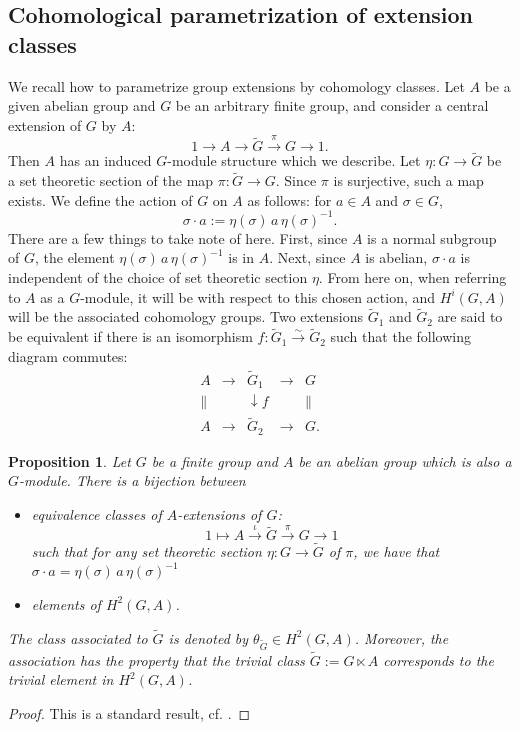 \documentclass[11pt,reqno]{amsart}
\newtheorem{proposition}[theorem]{Proposition}
\numberwithin{equation}{section}
\begin{document}
\subsection{Cohomological parametrization of extension classes}
\par We recall how to parametrize group extensions by cohomology classes. Let $A$ be a given abelian group and $G$ be an arbitrary finite group, and consider a central extension of $G$ by $A$:
\[1\rightarrow A\rightarrow \widetilde{G}\xrightarrow{\pi} G\rightarrow 1.\]
Then $A$ has an induced $G$-module structure which we describe. Let $\eta: G\rightarrow \widetilde{G}$ be a set theoretic section of the map $\pi: \widetilde{G}\rightarrow G$. Since $\pi$ is surjective, such a map exists. We define the action of $G$ on $A$ as follows: for $a\in A$ and $\sigma\in G$,
\[\sigma\cdot a:=\eta(\sigma) \, a \, \eta(\sigma)^{-1}.\] There are a few things to take note of here. First, since $A$ is a normal subgroup of $G$, the element $\eta(\sigma) \, a \, \eta(\sigma)^{-1}$ is in $A$. Next, since $A$ is abelian, $\sigma\cdot a$ is independent of the choice of set theoretic section $\eta$. From here on, when referring to $A$ as a $G$-module, it will be with respect to this chosen action, and $H^i(G, A)$ will be the associated cohomology groups. Two extensions $\widetilde{G}_{1}$ and $\widetilde{G}_{2}$ are said to be equivalent if there is an isomorphism $f:\widetilde{G}_1\xrightarrow{\sim} \widetilde{G}_2$ such that the following diagram commutes:
$$
\begin{array}{ccccc}
A & \longrightarrow & \widetilde{G}_{1} & \longrightarrow & G  \\
\| & & \downarrow{f} & & \| \\
A & \longrightarrow & \widetilde{G}_{2} & \longrightarrow & G.
\end{array}
$$


\begin{proposition}
    Let $G$ be a finite group and $A$ be an abelian group which is also a $G$-module. There is a bijection between
    \begin{itemize}
        \item equivalence classes of $A$-extensions of $G$:
        \[1\mapsto A\xrightarrow{\iota} \widetilde{G}\xrightarrow{\pi} G\rightarrow 1\]
        such that for any set theoretic section $\eta:G\rightarrow \widetilde{G}$ of $\pi$, we have that $\sigma\cdot a=\eta(\sigma) \, a \, \eta(\sigma)^{-1}$
        \item elements of $H^2(G, A)$. 
    \end{itemize}
    The class associated to $\widetilde{G}$ is denoted by $\theta_{\widetilde{G}}\in H^2(G, A)$. Moreover, the association has the property that the \emph{trivial} class $\widetilde{G}:=G\ltimes A$ corresponds to the trivial element in $H^2(G, A)$.
\end{proposition}
\begin{proof}
    This is a standard result, cf. \cite[Theorem 6.6.3]{weibel}.
\end{proof}
\end{document}
